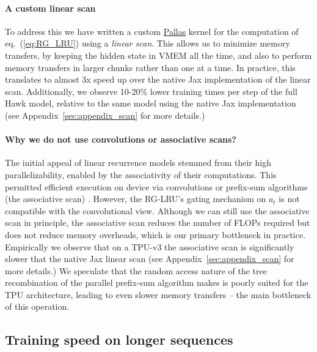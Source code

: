 \documentclass[11pt, a4paper, logo, onecolumn]{googledeepmind}
\theoremstyle{definition}
\begin{document}
\paragraph{A custom linear scan}

To address this we have written a custom \href{http://go/jax-pallas}{Pallas} kernel for the computation of eq.~(\ref{eq:RG_LRU}) using a \emph{linear scan}. 
This allows us to minimize memory transfers, by keeping the hidden state in VMEM all the time, and also to perform memory transfers in larger chunks rather than one at a time. 
In practice, this translates to almost 3x speed up over the native Jax implementation of the linear scan. 
Additionally, we observe 10-20\% lower training times per step of the full Hawk model, relative to the same model using the native Jax implementation (see Appendix~\ref{sec:appendix_scan} for more details.)



\paragraph{Why we do not use convolutions or associative scans?}

The initial appeal of linear recurrence models stemmed from their high parallelizability, enabled by the associativity of their computations. 
This permitted efficient execution on device via convolutions \citep{gu2021combining} or prefix-sum algorithms (the associative scan) \citep{smith2022simplified}. 
However, the RG-LRU's gating mechanism on $a_t$ is not compatible with the convolutional view.
Although we can still use the associative scan in principle, the associative scan reduces the number of FLOPs required but does not reduce memory overheads, which is our primary bottleneck in practice. 
Empirically we observe that on a TPU-v3 the associative scan is significantly slower that the native Jax linear scan (see Appendix~\ref{sec:appendix_scan} for more details.)
We speculate that the random access nature of the tree recombination of the parallel prefix-sum algorithm makes is poorly suited for the TPU architecture, leading to even slower memory transfers -- the main bottleneck of this operation.


\subsection{Training speed on longer sequences}
\end{document}
